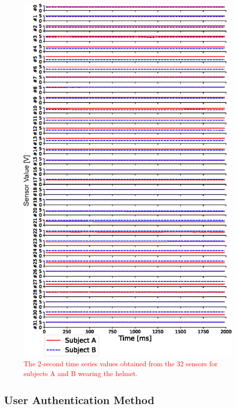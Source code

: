 \documentclass[english,preprint,JIP]{ipsj}
\begin{document}
\begin{figure}[!t]
  \centering
    \includegraphics[width=1\linewidth]{figure/sensor_values.eps}
  \caption{\textcolor{red}{The 2-second time series values obtained from the 32 sensors for subjects A and B wearing the helmet.}}
  \label{fig:sensor_values}
\end{figure}


\subsection{User Authentication Method}
\end{document}
